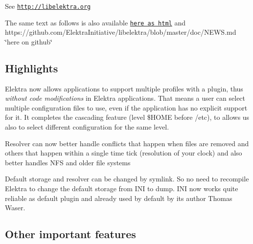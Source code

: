 See \href{http://libelektra.org}{\tt http\+://libelektra.\+org}

The same text as follows is also available \href{http://doc.libelektra.org/news/9c9247ee-ee9c-4f4a-a68e-76959def9b82.html}{\tt here as html} and https\+://github.com/\+Elektra\+Initiative/libelektra/blob/master/doc/\+N\+E\+W\+S.\+md \char`\"{}here on github\char`\"{}

\subsection*{Highlights}


\begin{DoxyItemize}
\item Elektra now allows applications to support multiple profiles with a plugin, thus {\itshape without code modifications} in Elektra applications. That means a user can select multiple configuration files to use, even if the application has no explicit support for it. It completes the cascading feature (level \$\+H\+O\+M\+E before /etc), to allows us also to select different configuration for the same level.
\item Resolver can now better handle conflicts that happen when files are removed and others that happen within a single time tick (resolution of your clock) and also better handles N\+F\+S and older file systems
\item Default storage and resolver can be changed by symlink. So no need to recompile Elektra to change the default storage from I\+N\+I to dump. I\+N\+I now works quite reliable as default plugin and already used by default by its author Thomas Waser.
\end{DoxyItemize}

\subsection*{Other important features}


